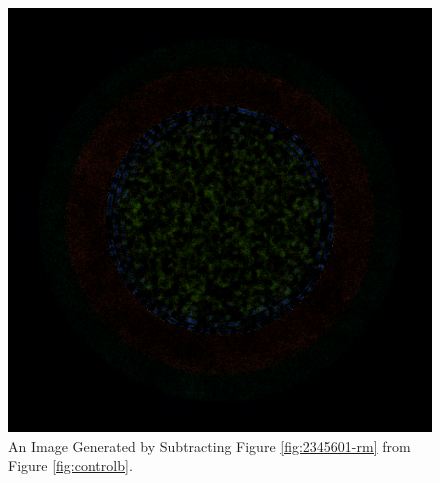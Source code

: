 \begin{figure}[H]
\centering
\includegraphics[width=0.6\linewidth]{figures/shuffle/diff-2345601}
\caption{An Image Generated by Subtracting Figure \ref{fig:2345601-rm} from Figure \ref{fig:controlb}.}
\label{fig:diff-2345601}
\end{figure}